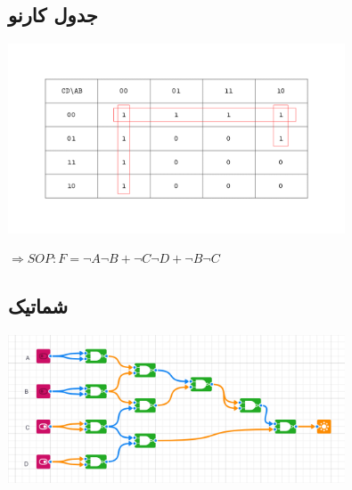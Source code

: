 \documentclass[a4paper]{article}
\begin{document}
\subsection*{جدول کارنو}
\includegraphics[width=10cm]{images/karno1_2.png}

\begin{latin}
$ \Longrightarrow SOP: F = \neg A \neg B + \neg C \neg D + \neg B \neg C $
\end{latin}

\subsection*{شماتیک}
\includegraphics[width=10cm]{images/nand1_2.png}
\end{document}
